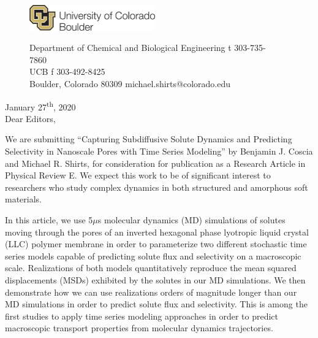 \documentclass[fontsize=11pt]{article}
\begin{document}
	\graphicspath{{./figures/}}

	\begin{figure}
	\centering
	\begin{minipage}{0.37\textwidth}
	\includegraphics[width=2.14in,left]{CUBoulder.pdf}
	\end{minipage}
	\begin{minipage}{0.62\textwidth}
	\scriptsize
	\noindent Department of Chemical and Biological Engineering \hfill t 303-735-7860~~~~~~~~~~~~~~~~~~ \\
	 UCB \hfill f 303-492-8425~~~~~~~~~~~~~~~~~~ \\
	\noindent Boulder, Colorado 80309 \hfill michael.shirts@colorado.edu \\
	\end{minipage}
	\end{figure}
	
	\noindent January 27\textsuperscript{th}, 2020\\

	\noindent Dear Editors, \\
	
	\newcommand{\ManuscriptTitle}{Capturing Subdiffusive Solute Dynamics and 
	Predicting Selectivity in Nanoscale Pores with Time Series Modeling}
	
	We are submitting ``\ManuscriptTitle'' by Benjamin J. Coscia and
	Michael R.  Shirts, for consideration for publication as a Research
	Article in Physical Review E. We expect this work to be of significant
	interest to researchers who study complex dynamics in both structured
	and amorphous soft materials.
	
	In this article, we use 5$\mu$s molecular dynamics (MD) simulations of
	solutes moving through the pores of an inverted hexagonal phase lyotropic
	liquid crystal (LLC) polymer membrane in order to parameterize two different
	stochastic time series models capable of predicting solute flux and selectivity
	on a macroscopic scale.  Realizations of both models quantitatively reproduce
	the mean squared displacements (MSDs) exhibited by the solutes in our MD
	simulations. We then demonstrate how we can use realizations orders of
	magnitude longer than our MD simulations in order to predict solute flux and
	selectivity.  This is among the first studies to apply time series modeling
	approaches in order to predict macroscopic transport properties from molecular
	dynamics trajectories.
\end{document}
